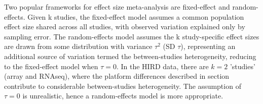 %
%
%

Two popular frameworks for effect size meta-analysis are fixed-effect and random-effects\autocite{cohn2003HowMetaanalysisIncreases,borenstein2010BasicIntroductionFixedeffect}.
Given k studies, the fixed-effect model assumes a common population effect size shared across all studies, with observed variation explained only by sampling error.
The random-effects model assumes the k study-specific effect sizes are drawn from some distribution with variance $\tau^2$ (\gls{SD} $\tau$), representing an additional source of variation termed the between-studies heterogeneity, reducing to the fixed-effect model when $\tau=0$.
In the \gls{HIRD} data, there are $k=2$ 'studies' (array and \gls{RNAseq}), where the platform differences described in section contribute to considerable between-studies heterogeneity.
The assumption of $\tau=0$ is unrealistic, hence a random-effects model is more appropriate.

